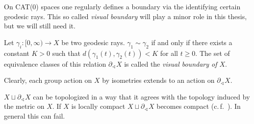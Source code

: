 

On CAT(0) spaces one regularly defines a boundary via the identifying certain geodesic rays. This so called \emph{visual boundary} will play a minor role in this thesis, but we will still need it. 

\begin{defin}
  Let \(\gamma_i \colon [0, \infty) \to X\) be two geodesic rays. \(\gamma_1 \sim \gamma_2\) if and only if there exists a constant \(K > 0 \) such that \(d(\gamma_1(t), \gamma_2(t)) < K\) for all \(t \geq 0\). The set of equivalence classes of this relation \(\partial_\sphericalangle X\) is called the \emph{visual boundary of \(X\)}.

  Clearly, each group action on \(X\) by isometries extends to an action on \(\partial_\sphericalangle X\).
\end{defin}

\begin{rem}
  \(X \sqcup \partial_{\sphericalangle}X\) can be topologized in a way that it agrees with the topology induced by the metric on \(X\). If \(X\) is locally compact \(X \sqcup \partial_\sphericalangle X\) becomes compact (c.\,f.~\cite[Sec.~II.8]{MR1744486}). In general this can fail.
\end{rem}


